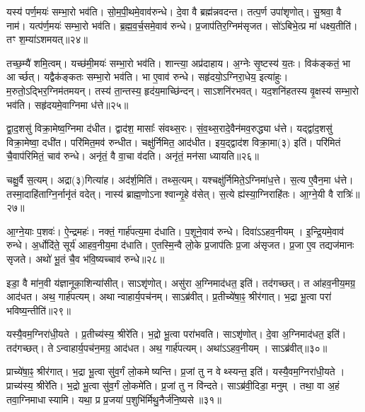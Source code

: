 यस्य॑ पर्ण॒मयः॑ सम्भा॒रो भव॑ति।
सो॒म॒पी॒थमे॒वाव॑रुन्धे।
दे॒वा वै ब्रह्म॑न्नवदन्त।
तत्प॒र्ण उपा॑शृणोत्।
सु॒श्रवा॒ वै नाम॑।
यत्प॑र्ण॒मयः॑ सम्भा॒रो भव॑ति।
ब्र॒ह्म॒व॒र्च॒समे॒वाव॑ रुन्धे।
प्र॒जाप॑तिर॒ग्निम॑सृजत।
सो॑ऽबिभे॒त्प्र मा॑ धक्ष्य॒तीति॑।
तꣳ श॒म्या॑\-ऽशमयत्॥२४॥

तच्छ॒म्यै॑ शमि॒त्वम्।
यच्छ॑मी॒मयः॑ सम्भा॒रो भव॑ति।
शान्त्या॒ अप्र॑दाहाय।
अ॒ग्नेः सृ॒ष्टस्य॑ य॒तः।
विक॑ङ्कतं॒ भा आर्च्छत्।
यद्वैक॑ङ्कतः सम्भा॒रो भव॑ति।
भा ए॒वाव॑ रुन्धे।
सहृ॑दयो॒\-ऽग्निरा॒धेय॒ इत्या॑हुः।
म॒रुतो॒\-ऽद्भिर॒ग्निम॑तमयन्।
तस्य॑ ता॒न्तस्य॒ हृद॑य॒माच्छि॑न्दन्।
साऽशनि॑रभवत्।
यद॒शनि॑हतस्य वृ॒क्षस्य॑ सम्भा॒रो भव॑ति।
सहृ॑दयमे॒वाग्निमा ध॑त्ते॥२५॥

द्वा॒द॒शसु॑ विक्रा॒मेष्व॒ग्निमा द॑धीत।
द्वाद॑श॒ मासाः᳚ संवथ्स॒रः।
सं॒व॒थ्स॒रादे॒वैन॑मव॒रुद्ध्या ध॑त्ते।
यद्द्वा॑द॒शसु॑ विक्रा॒मेष्वा॒ दधी॑त।
परि॑मित॒मव॑ रुन्धीत।
चक्षु॑र्निमित॒ आद॑धीत।
इय॒द्द्वाद॑श विक्रा॒मा(३) इति॑।
परि॑मितं चै॒वाप॑रिमितं॒ चाव॑ रुन्धे।
अनृ॑तं॒ वै वा॒चा व॑दति।
अनृ॑तं॒ मन॑सा ध्यायति॥२६॥

चक्षु॒र्वै स॒त्यम्।
अद्रा(३)गित्या॑ह।
अद॑र्\mbox{}श॒मिति॑।
तथ्स॒त्यम्।
यश्चक्षु॑र्निमिते॒\-ऽग्निमा॑ध॒त्ते।
स॒त्य ए॒वैन॒मा ध॑त्ते।
तस्मा॒दाहि॑ताग्नि॒र्नानृ॑तं वदेत्।
नास्य॑ ब्राह्म॒णो\-ऽनाश्वान्गृ॒हे व॑सेत्।
स॒त्ये ह्य॑स्या॒ग्निराहि॑तः।
आ॒ग्ने॒यी वै रात्रिः॑॥२७॥

आ॒ग्ने॒याः प॒शवः॑।
ऐ॒न्द्रमहः॑।
नक्तं॒ गार्\mbox{}ह॑पत्य॒मा द॑धाति।
प॒शूने॒वाव॑ रुन्धे।
दिवा॑ऽऽहव॒नीयम्।
इ॒न्द्रि॒यमे॒वाव॑ रुन्धे।
अ॒र्धोदि॑ते॒ सूर्य॑ आहव॒नीय॒मा द॑धाति।
ए॒तस्मि॒न्वै लो॒के प्र॒जाप॑तिः प्र॒जा अ॑सृजत।
प्र॒जा ए॒व तद्यज॑मानः सृजते।
अथो॑ भू॒तं चै॒व भ॑वि॒ष्यच्चाव॑ रुन्धे॥२८॥

इडा॒ वै मा॑न॒वी य॑ज्ञानूका॒शिन्या॑सीत्।
साऽशृ॑णोत्।
असु॑रा अ॒ग्निमाद॑धत॒ इति॑।
तद॑गच्छत्।
त आ॑हव॒नीय॒मग्र॒ आद॑धत।
अथ॒ गार्\mbox{}ह॑पत्यम्।
अथान्वाहार्य॒पच॑नम्।
साऽब्र॑वीत्।
प्र॒तीच्ये॑षा॒ꣴ॒ श्रीर॑गात्।
भ॒द्रा भू॒त्वा परा॑ भविष्य॒न्तीति॑॥२९॥

यस्यै॒वम॒ग्निरा॑धी॒यते।
प्र॒तीच्य॑स्य॒ श्रीरे॑ति।
भ॒द्रो भू॒त्वा परा॑भवति।
साऽशृ॑णोत्।
दे॒वा अ॒ग्निमाद॑धत॒ इति॑।
तद॑गच्छत्।
तेऽन्वाहार्य॒पच॑न॒मग्र॒ आद॑धत।
अथ॒ गार्\mbox{}ह॑पत्यम्।
अथा॑ऽऽहव॒नीयम्।
साऽब्र॑वीत्॥३०॥

प्राच्ये॑षा॒ꣴ॒ श्रीर॑गात्।
भ॒द्रा भू॒त्वा सु॑व॒र्गं लो॒कमेष्यन्ति।
प्र॒जां तु न वेथ्स्यन्त॒ इति॑।
यस्यै॒वम॒ग्निरा॑धी॒यते।
प्राच्य॑स्य॒ श्रीरे॑ति।
भ॒द्रो भू॒त्वा सु॑व॒र्गं लो॒कमे॑ति।
प्र॒जां तु न वि॑न्दते।
साऽब्र॑वी॒दिडा॒ मनुम्।
तथा॒ वा अ॒हं तवा॒ग्निमाधास्यामि।
यथा॒ प्र प्र॒जया॑ प॒शुभि॑र्मिथु॒नैर्ज॑नि॒ष्यसे॥३१॥

